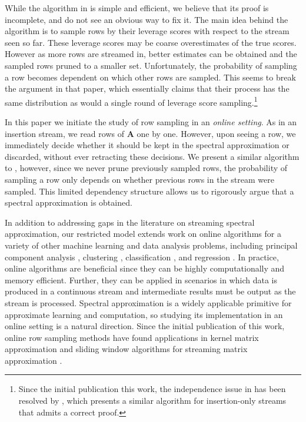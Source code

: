 \documentclass[11pt]{article}
\numberwithin{equation}{section}
\theoremstyle{definition}
\theoremstyle{plain}
\newcommand{\bv}[1]{\mathbf{#1}}
\begin{document}
While the algorithm in \cite{kelner2013spectral} is simple and efficient, we believe that its proof is incomplete, and do not see an obvious way to fix it. The main idea behind the algorithm is to sample rows by their leverage scores with respect to the stream seen so far. These leverage scores may be coarse overestimates of the true scores. However as more rows are streamed in, better estimates can be obtained and the sampled rows pruned to a smaller set.  Unfortunately, the probability of sampling a row becomes dependent on which other rows are sampled.  This seems to break the argument in that paper, which essentially claims that their process has the same distribution as would a single round of leverage score sampling.\footnote{Since the initial publication this work, the independence issue in \cite{kelner2013spectral} has been resolved by \cite{kyng2017framework}, which presents a similar algorithm for insertion-only streams that admits a correct proof.}

In this paper we initiate the study of row sampling in an \emph{online setting}. As in an insertion stream, we read rows of $\bv A$ one by one. However, upon seeing a row, we immediately decide whether it should be kept in the spectral approximation or discarded, without ever retracting these decisions. 
We present a similar algorithm to \cite{kelner2013spectral}, however, since we never prune previously sampled rows, the probability of sampling a row only depends on whether previous rows in the stream were sampled. This limited dependency structure allows us to rigorously argue that a spectral approximation is obtained.

In addition to addressing gaps in the literature on streaming spectral approximation, our restricted model extends work on online algorithms for a variety of other machine learning and data analysis problems, including principal component analysis \cite{boutsidis2015online}, clustering \cite{liberty2014algorithm}, classification \cite{bordes2005huller,crammer2006online}, and regression \cite{crammer2006online}. In practice, online algorithms are beneficial since they can be highly computationally and memory efficient. Further, they can be applied in scenarios in which data is produced in a continuous stream and intermediate results must be output as the stream is processed.
Spectral approximation is a widely applicable primitive for approximate learning and computation, so studying its implementation in an online setting is a natural direction.
Since the initial publication of this work, online row sampling methods have found applications in kernel matrix approximation \cite{calandriello2017efficient,calandriello2017second} and sliding window algorithms for streaming matrix approximation \cite{braverman2018numerical}.
\end{document}
